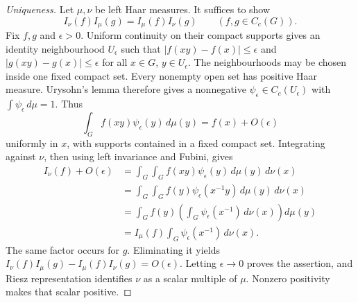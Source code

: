 \documentclass[UTF8,11pt]{ctexart}
\theoremstyle{definition}
\begin{document}
\begin{proof}[Uniqueness]
Let $\mu,\nu$ be left Haar measures. It suffices to show
\[
 I_\nu(f)I_\mu(g)=I_\mu(f)I_\nu(g)\qquad(f,g\in C_c(G)).
\]
Fix $f,g$ and $\epsilon>0$. Uniform continuity on their compact supports
gives an identity neighbourhood $U_\epsilon$ such that
$|f(xy)-f(x)|\leq\epsilon$ and $|g(xy)-g(x)|\leq\epsilon$ for all $x\in G$,
$y\in U_\epsilon$. The neighbourhoods may be chosen inside one fixed compact
set. Every nonempty open set has positive Haar measure. Urysohn's lemma
therefore gives a nonnegative $\psi_\epsilon\in C_c(U_\epsilon)$ with
$\int\psi_\epsilon\,d\mu=1$. Thus
\[
 \int_G f(xy)\psi_\epsilon(y)\,d\mu(y)=f(x)+O(\epsilon)
\]
uniformly in $x$, with supports contained in a fixed compact set.
Integrating against $\nu$, then using left invariance and Fubini, gives
\[
\begin{aligned}
 I_\nu(f)+O(\epsilon)
 &=\int_G\int_G f(xy)\psi_\epsilon(y)\,d\mu(y)\,d\nu(x)\\
 &=\int_G\int_G f(y)\psi_\epsilon(x^{-1}y)\,d\mu(y)\,d\nu(x)\\
 &=\int_G f(y)\left(\int_G\psi_\epsilon(x^{-1})\,d\nu(x)\right)d\mu(y)\\
 &=I_\mu(f)\int_G\psi_\epsilon(x^{-1})\,d\nu(x).
\end{aligned}
\]
The same factor occurs for $g$. Eliminating it yields
$I_\nu(f)I_\mu(g)-I_\mu(f)I_\nu(g)=O(\epsilon)$.
Letting $\epsilon\to0$ proves the assertion, and Riesz representation
identifies $\nu$ as a scalar multiple of $\mu$. Nonzero positivity makes
that scalar positive.
\end{proof}
\end{document}
